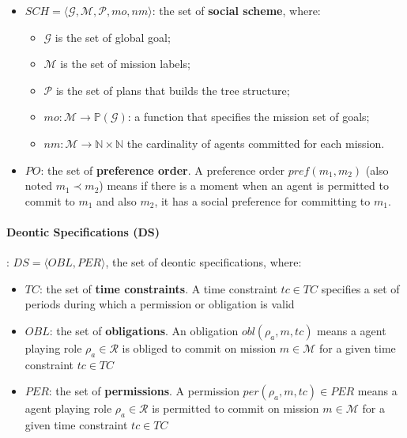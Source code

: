 \documentclass[runningheads]{llncs}
\begin{document}
\begin{itemize}
    \item $SCH = \langle\mathcal{G}, \mathcal{M}, \mathcal{P}, mo, nm \rangle$: the set of \textbf{social scheme}, where:
          \begin{itemize}
              \item $\mathcal{G}$ is the set of global goal;
              \item $\mathcal{M}$ is the set of mission labels;
              \item $\mathcal{P}$ is the set of plans that builds the tree structure;
              \item $mo: \mathcal{M} \rightarrow \mathbb{P}(\mathcal{G})$: a function that specifies the mission set of goals;
              \item $nm: \mathcal{M} \rightarrow \mathbb{N} \times \mathbb{N}$ the cardinality of agents committed for each mission.
          \end{itemize}
    \item $PO$: the set of \textbf{preference order}. A preference order $pref(m_1, m_2)$ (also noted $m_{1} \prec m_{2}$) means if there is a moment when an agent is permitted to commit to $m_{1}$ and also $m_{2}$, it has a social preference for committing to $m_{1}$.
\end{itemize}

\paragraph{\textbf{Deontic Specifications (DS)}}: $DS = \langle OBL,PER \rangle$, the set of deontic specifications, where:

\begin{itemize}
    \item $TC$: the set of \textbf{time constraints}. A time constraint $tc \in TC$ specifies a set of periods during which a permission or obligation is valid
    \item $OBL$: the set of \textbf{obligations}. An obligation $obl(\rho_a,m,tc)$ means a agent playing role $\rho_a \in \mathcal{R}$ is obliged to commit on mission $m \in \mathcal{M}$ for a given time constraint $tc \in TC$
    \item $PER$: the set of \textbf{permissions}. A permission $per(\rho_a,m,tc) \in PER$ means a agent playing role $\rho_a \in \mathcal{R}$ is permitted to commit on mission $m \in \mathcal{M}$ for a given time constraint $tc \in TC$
\end{itemize}
\end{document}
